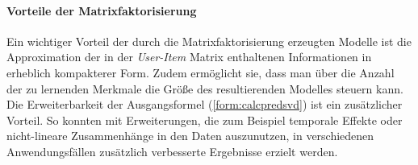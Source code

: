 \paragraph{Vorteile der Matrixfaktorisierung} Ein wichtiger Vorteil der durch die Matrixfaktorisierung erzeugten Modelle ist die Approximation der in der \textit{User-Item} Matrix enthaltenen Informationen in erheblich kompakterer Form. Zudem ermöglicht sie, dass man über die Anzahl der zu lernenden Merkmale die Größe des resultierenden Modelles steuern kann. Die Erweiterbarkeit der Ausgangsformel (\ref{form:calcpredsvd}) ist ein zusätzlicher Vorteil. So konnten mit Erweiterungen, die zum Beispiel temporale Effekte oder nicht-lineare Zusammenhänge in den Daten auszunutzen, in verschiedenen Anwendungsfällen zusätzlich verbesserte Ergebnisse erzielt werden. \citep{hb_05,Vozalis:2007:USD:1243505.1243639}


{}
